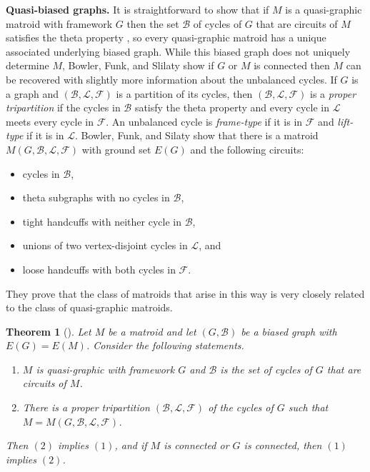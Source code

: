 \documentclass[12pt]{article}
\newtheorem{theorem}{Theorem}[section]
\theoremstyle{definition}
\theoremstyle{plain} %
\newcommand{\cB}{\mathcal{B}}
\newcommand{\cF}{\mathcal{F}}
\newcommand{\cL}{\mathcal{L}}
\begin{document}
\bigskip
\noindent 
\textbf{Quasi-biased graphs.}
It is straightforward to show that if $M$ is a quasi-graphic matroid with framework $G$ then the set $\cB$ of cycles of $G$ that are circuits of $M$ satisfies the theta property \cite[Lemma 3.2]{Geelen-Gerards-Whittle18}, so every quasi-graphic matroid has a unique associated underlying biased graph.
While this biased graph does not uniquely determine $M$, Bowler, Funk, and Slilaty \cite{Bowler-Funk-Slilaty24-corrigendum} show if $G$ or $M$ is connected then $M$ can be recovered with slightly more information about the unbalanced cycles.
If $G$ is a graph and $(\cB, \cL, \cF)$ is a partition of its cycles, then $(\cB, \cL, \cF)$ is a \emph{proper tripartition} if the cycles in $\cB$ satisfy the theta property and every cycle in $\cL$ meets every cycle in $\cF$.
An unbalanced cycle is \emph{frame-type} if it is in $\cF$ and \emph{lift-type} if it is in $\cL$.
Bowler, Funk, and Silaty \cite[Theorem 2.3]{Bowler-Funk-Slilaty20} show that there is a matroid $M(G, \cB, \cL, \cF)$ with ground set $E(G)$ and the following circuits:
\begin{itemize}
    \item cycles in $\cB$,
    \item theta subgraphs with no cycles in $\cB$,
    \item tight handcuffs with neither cycle in $\cB$,
    \item unions of two vertex-disjoint cycles in $\cL$, and
    \item loose handcuffs with both cycles in $\cF$.
\end{itemize}
They prove that the class of matroids that arise in this way is very closely related to the class of quasi-graphic matroids.

\begin{theorem} [{\cite[Theorem 2]{Bowler-Funk-Slilaty24-corrigendum}}] \label{thm: equivalence of frameworks and proper tripartitions}
Let $M$ be a matroid and let $(G, \cB)$ be a biased graph with $E(G) = E(M)$.
Consider the following statements.
\begin{enumerate}[$(1)$]
\item $M$ is quasi-graphic with framework $G$ and $\cB$ is the set of cycles of $G$ that are circuits of $M$.

\item There is a proper tripartition $(\cB, \cL, \cF)$ of the cycles of $G$ such that $M = M(G, \cB, \cL, \cF)$.
\end{enumerate}
Then $(2)$ implies $(1)$, and if $M$ is connected or $G$ is connected, then $(1)$ implies $(2)$.
\end{theorem}
\end{document}
